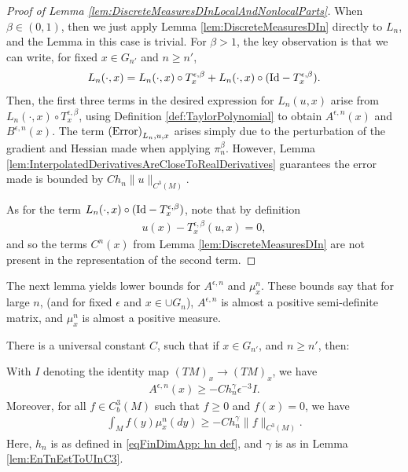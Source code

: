 \documentclass[11pt,reqno]{amsart}
\numberwithin{equation}{section}
\theoremstyle{plain}
\def\gam{\gamma}
\def\Id{\textnormal{Id}}
\newcommand{\norm}[1]{\lVert#1\rVert}
\begin{document}
\begin{proof}[Proof of Lemma \ref{lem:DiscreteMeasuresDInLocalAndNonlocalParts}]
  When $\beta\in(0,1)$, then we just apply Lemma \ref{lem:DiscreteMeasuresDIn} directly to $L_n$, and the Lemma in this case is trivial. For $\beta>1$, the key observation is that we can write, for fixed $x\in G_{n'}$ and $n\geq n'$,
  \begin{align*}
    L_n(\cdot,x) = L_n(\cdot,x)\circ T^{\epsilon,\beta}_x + L_n(\cdot,x)\circ(\Id - T^{\epsilon,\beta}_x).
  \end{align*}
  Then, the first three terms in the desired expression for $L_n(u,x)$ arise from $L_n(\cdot,x)\circ T^{\epsilon,\beta}_x$, using Definition \ref{def:TaylorPolynomial} to obtain $A^{\epsilon,n}(x)$ and $B^{\epsilon,n}(x)$. The term $\textnormal{(Error)}_{L_n,u,x}$ arises simply due to the perturbation of the gradient and Hessian made when applying $\pi_n^\beta$. However, Lemma \ref{lem:InterpolatedDerivativesAreCloseToRealDerivatives} guarantees the error made is bounded by $Ch_n\|u\|_{C^3(M)}$.
  
  As for the term $L_n(\cdot,x)\circ(\Id - T^{\epsilon,\beta}_x)$, note that by definition 
  \begin{align*}
    u(x)-T^{\epsilon,\beta}_x(u,x)=0,
  \end{align*}
  and so the terms $C^n(x)$ from Lemma \ref{lem:DiscreteMeasuresDIn} are not present in the representation of the second term.
\end{proof}

The next lemma yields lower bounds for $A^{\epsilon,n}$ and $\mu^{n}_x$. These bounds say that for large $n$, (and for fixed $\epsilon$ and $x\in \cup G_n$), $A^{\epsilon,n}$ is almost a positive semi-definite matrix, and $\mu^{n}_x$ is almost a positive measure.

\begin{lem}\label{lem:DiscreteIngredientBounds}  There is a universal constant $C$, such that if $x\in G_{n'}$, and $n\geq n'$, then:

  With $I$ denoting the identity map $(TM)_x\to (TM)_x$, we have
  \begin{align*}
    A^{\epsilon,n}(x)\geq -Ch_n^\gam\epsilon^{-3}I.
  \end{align*}
  Moreover,  for all $f\in C^3_b(M)$ such that $f\geq 0$ and $f(x)=0$, we have
  \begin{align*}
    \int_M f(y) \mu^n_x(dy)\geq -Ch_n^\gam\norm{f}_{C^3(M)}.
  \end{align*}
  Here, $h_n$ is as defined in \eqref{eqFinDimApp: hn def}, and $\gamma$ is as in Lemma \ref{lem:EnTnEstToUInC3}.
\end{lem}
\end{document}
